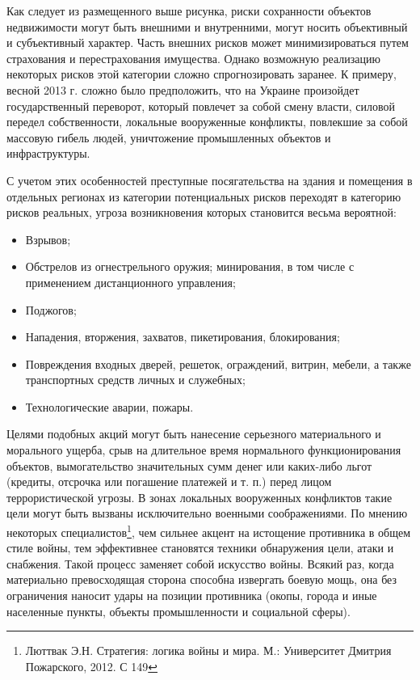 \documentclass[a4paper,12pt,fleqn]{article} %
\begin{document}
Как следует из размещенного выше рисунка, риски сохранности объектов недвижимости могут быть внешними и внутренними, могут носить объективный и субъективный характер. Часть внешних рисков может минимизироваться путем страхования и перестрахования имущества. Однако возможную реализацию некоторых рисков этой категории сложно спрогнозировать заранее. К примеру, весной 2013 г. сложно было предположить, что на Украине произойдет государственный переворот, который повлечет за собой смену власти, силовой передел собственности, локальные вооруженные конфликты, повлекшие за собой массовую гибель людей, уничтожение промышленных объектов и инфраструктуры.

С учетом этих особенностей преступные посягательства на здания и помещения в отдельных регионах из категории потенциальных рисков переходят в категорию рисков реальных, угроза возникновения которых становится весьма вероятной:
\begin{itemize}
	\item Взрывов;
	\item Обстрелов из огнестрельного оружия;
	минирования, в том числе с применением дистанционного управления;
	\item Поджогов;
	\item Нападения, вторжения, захватов, пикетирования, блокирования;
	\item Повреждения входных дверей, решеток, ограждений, витрин, мебели, а также транспортных средств личных и служебных;
	\item Технологические аварии, пожары.
\end{itemize}

Целями подобных акций могут быть нанесение серьезного материального и морального ущерба, срыв на длительное время нормального функционирования объектов, вымогательство значительных сумм денег или каких-либо льгот (кредиты, отсрочка или погашение платежей и т. п.) перед лицом террористической угрозы. В зонах локальных вооруженных конфликтов такие цели могут быть вызваны исключительно военными соображениями. По мнению некоторых специалистов\footnote{Люттвак Э.Н. Стратегия: логика войны и мира. М.: Университет Дмитрия Пожарского, 2012. С 149}, чем сильнее акцент на истощение противника в общем стиле войны, тем эффективнее становятся техники обнаружения цели, атаки и снабжения. Такой процесс заменяет собой искусство войны. Всякий раз, когда материально превосходящая сторона способна извергать боевую мощь, она без ограничения наносит удары на позиции противника (окопы, города и иные населенные пункты, объекты промышленности и социальной сферы).
\end{document}
